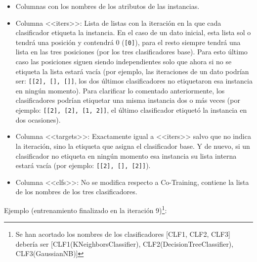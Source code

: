 \begin{itemize}
    \item Columnas con los nombres de los atributos de las instancias.
    \item Columna <<iters>>: Lista de listas con la iteración en la que cada
    clasificador etiqueta la instancia. En el caso de un dato inicial, esta
    lista sol o tendrá una posición y contendrá 0 (\texttt{[0]}), para el resto
    siempre tendrá una lista en las tres posiciones (por los tres clasificadores
    base). Para esto último caso las posiciones siguen siendo independientes
    solo que ahora si no se etiqueta la lista estará vacía (por ejemplo, las
    iteraciones de un dato podrían ser: \texttt{[[2], [], []]}, los dos últimos
    clasificadores no etiquetaron esa instancia en ningún momento). Para
    clarificar lo comentado anteriormente, los clasificadores podrían etiquetar
    una misma instancia dos o más veces (por ejemplo: \texttt{[[2], [2], [1,
    2]]}, el último clasificador etiquetó la instancia en dos ocasiones).
    \item Columna <<targets>>: Exactamente igual a <<iters>> salvo que no indica
    la iteración, sino la etiqueta que asigna el clasificador base. Y de nuevo,
    si un clasificador no etiqueta en ningún momento esa instancia su lista
    interna estará vacía (por ejemplo: \texttt{[[2], [], [2]]}).
    \item Columna <<clfs>>: No se modifica respecto a Co-Training, contiene la
    lista de los nombres de los tres clasificadores.
\end{itemize}

Ejemplo (entrenamiento finalizado en la iteración 9)\footnote{Se han acortado los nombres de los clasificadores [CLF1, CLF2, CLF3]
debería ser [CLF1(KNeighborsClassifier), CLF2(DecisionTreeClassifier),
CLF3(GaussianNB)]}:
\begin{table}[H]
    \caption{Ejemplo de DataFrame de Tri-Training}
\end{table}

